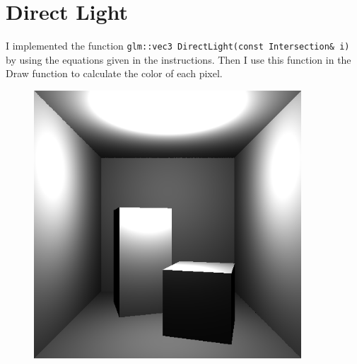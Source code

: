 \section{Direct Light}
I implemented the function \texttt{glm::vec3 DirectLight(const Intersection\& i)} by using the equations given in the instructions. Then I use 
this function in the Draw function to calculate the color of each pixel.
\begin{figure}[ht]
    \centering
    \includegraphics[width=10cm]{screenshots/incoming_light.png}
\end{figure}
\clearpage
